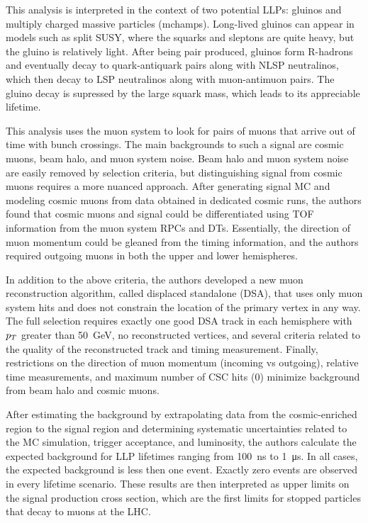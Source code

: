 \documentclass[12pt]{article}
\begin{document}
    This analysis is interpreted in the context of two potential LLPs: gluinos and multiply charged massive particles (mchamps). Long-lived gluinos can appear in models such as split SUSY, where the squarks and sleptons are quite heavy, but the gluino is relatively light. After being pair produced, gluinos form R-hadrons and eventually decay to quark-antiquark pairs along with NLSP neutralinos, which then decay to LSP neutralinos along with muon-antimuon pairs. The gluino decay is supressed by the large squark mass, which leads to its appreciable lifetime.

    This analysis uses the muon system to look for pairs of muons that arrive out of time with bunch crossings. The main backgrounds to such a signal are cosmic muons, beam halo, and muon system noise. Beam halo and muon system noise are easily removed by selection criteria, but distinguishing signal from cosmic muons requires a more nuanced approach. After generating signal MC and modeling cosmic muons from data obtained in dedicated cosmic runs, the authors found that cosmic muons and signal could be differentiated using TOF information from the muon system RPCs and DTs. Essentially, the direction of muon momentum could be gleaned from the timing information, and the authors required outgoing muons in both the upper and lower hemispheres.  
    
    In addition to the above criteria, the authors developed a new muon reconstruction algorithm, called displaced standalone (DSA), that uses only muon system hits and does not constrain the location of the primary vertex in any way. The full selection requires exactly one good DSA track in each hemisphere with $p_T$ greater than \SI{50}{\giga\electronvolt}, no reconstructed vertices, and several criteria related to the quality of the reconstructed track and timing measurement. Finally, restrictions on the direction of muon momentum (incoming vs outgoing), relative time measurements, and maximum number of CSC hits (0) minimize background from beam halo and cosmic muons.

    After estimating the background by extrapolating data from the cosmic-enriched region to the signal region and determining systematic uncertainties related to the MC simulation, trigger acceptance, and luminosity, the authors calculate the expected background for LLP lifetimes ranging from \SI{100}{\nano\s} to \SI{1}{\micro\s}. In all cases, the expected background is less then one event. Exactly zero events are observed in every lifetime scenario. These results are then interpreted as upper limits on the signal production cross section, which are the first limits for stopped particles that decay to muons at the LHC.
\end{document}
